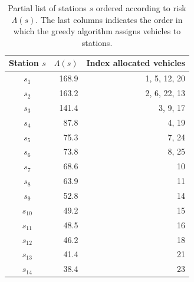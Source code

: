 \documentclass[twoside,11pt]{article}
\begin{document}
    \begin{table}[thb]
        \centering
        \begin{tabular}{|c|r|r|} \hline
        Station $s$ & $\Lambda(s)$ & Index allocated vehicles  \\
        \hline
        $s_1 $&  168.9 & 1, 5, 12, 20 \\
        $s_2$ &  163.2 & 2, 6, 22, 13 \\
        $s_3$ & 141.4 & 3, 9, 17 \\
        $s_4$ &  87.8 & 4, 19 \\
        $s_5$ & 75.3 & 7, 24 \\
        $s_6$ & 73.8 & 8, 25 \\
        $s_7$ & 68.6 & 10 \\
        $s_8$ & 63.9 & 11 \\
        $s_9$ & 52.8 & 14\\
        $s_{10}$ & 49.2 & 15\\
        $s_{11}$ & 48.5 & 16 \\ 
        $s_{12}$ & 46.2 & 18 \\
        $s_{13}$ & 41.4 & 21 \\
        $s_{14}$ & 38.4 & 23 \\
        \hline
        \end{tabular}
        \caption{Partial list of stations $s$ ordered according
        to risk $\Lambda(s)$. The last columns indicates the 
        order in which the greedy algorithm assigns vehicles to
        stations.}
        \label{tab:TwenteTable}
    \end{table}


\end{document}
